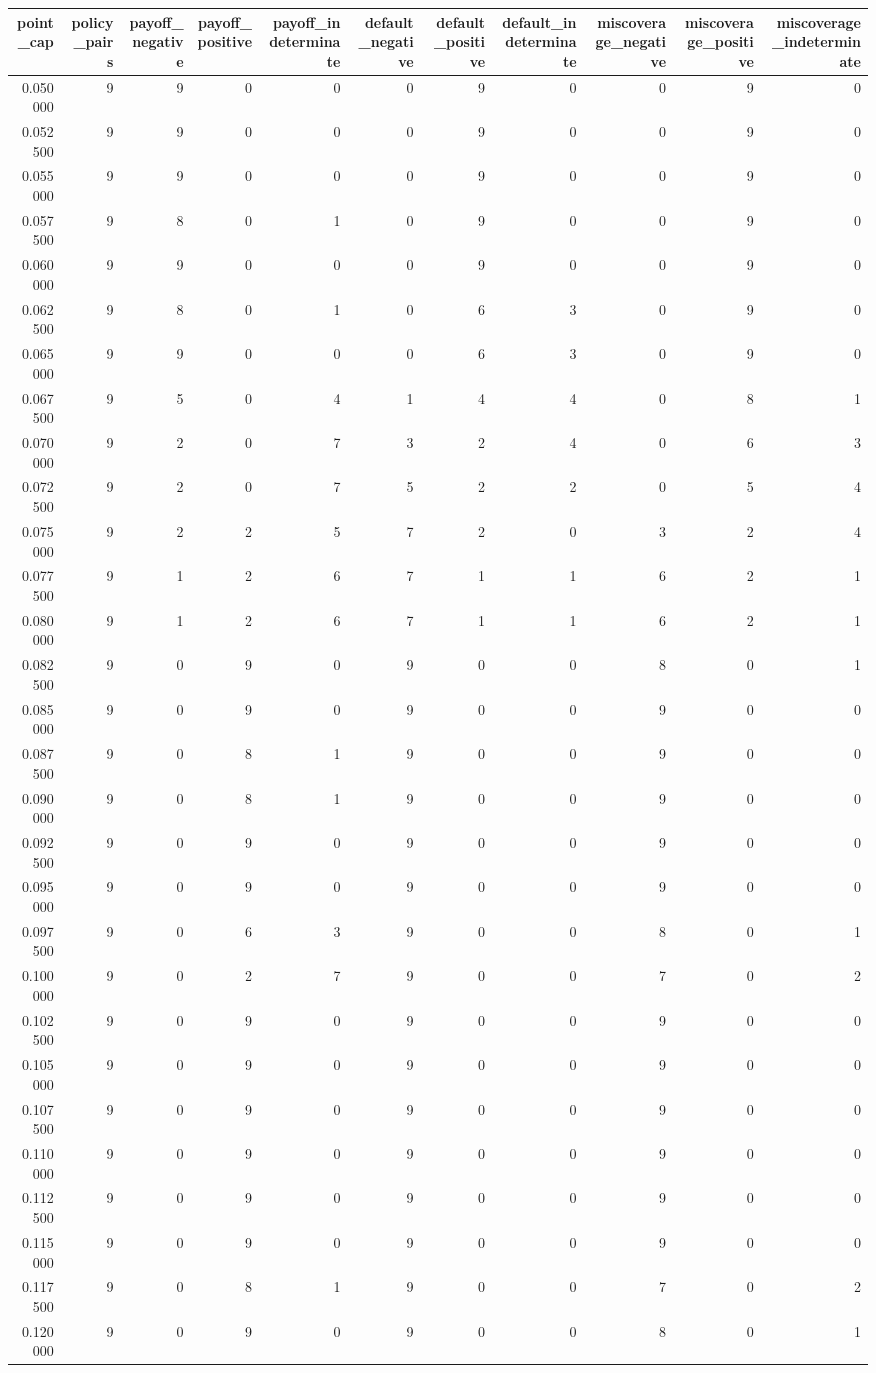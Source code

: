 \begin{tabular}{rrrrrrrrrrr}
\toprule
point\_cap & policy\_pairs & payoff\_negative & payoff\_positive & payoff\_indeterminate & default\_negative & default\_positive & default\_indeterminate & miscoverage\_negative & miscoverage\_positive & miscoverage\_indeterminate \\
\midrule
0.050000 & 9 & 9 & 0 & 0 & 0 & 9 & 0 & 0 & 9 & 0 \\
0.052500 & 9 & 9 & 0 & 0 & 0 & 9 & 0 & 0 & 9 & 0 \\
0.055000 & 9 & 9 & 0 & 0 & 0 & 9 & 0 & 0 & 9 & 0 \\
0.057500 & 9 & 8 & 0 & 1 & 0 & 9 & 0 & 0 & 9 & 0 \\
0.060000 & 9 & 9 & 0 & 0 & 0 & 9 & 0 & 0 & 9 & 0 \\
0.062500 & 9 & 8 & 0 & 1 & 0 & 6 & 3 & 0 & 9 & 0 \\
0.065000 & 9 & 9 & 0 & 0 & 0 & 6 & 3 & 0 & 9 & 0 \\
0.067500 & 9 & 5 & 0 & 4 & 1 & 4 & 4 & 0 & 8 & 1 \\
0.070000 & 9 & 2 & 0 & 7 & 3 & 2 & 4 & 0 & 6 & 3 \\
0.072500 & 9 & 2 & 0 & 7 & 5 & 2 & 2 & 0 & 5 & 4 \\
0.075000 & 9 & 2 & 2 & 5 & 7 & 2 & 0 & 3 & 2 & 4 \\
0.077500 & 9 & 1 & 2 & 6 & 7 & 1 & 1 & 6 & 2 & 1 \\
0.080000 & 9 & 1 & 2 & 6 & 7 & 1 & 1 & 6 & 2 & 1 \\
0.082500 & 9 & 0 & 9 & 0 & 9 & 0 & 0 & 8 & 0 & 1 \\
0.085000 & 9 & 0 & 9 & 0 & 9 & 0 & 0 & 9 & 0 & 0 \\
0.087500 & 9 & 0 & 8 & 1 & 9 & 0 & 0 & 9 & 0 & 0 \\
0.090000 & 9 & 0 & 8 & 1 & 9 & 0 & 0 & 9 & 0 & 0 \\
0.092500 & 9 & 0 & 9 & 0 & 9 & 0 & 0 & 9 & 0 & 0 \\
0.095000 & 9 & 0 & 9 & 0 & 9 & 0 & 0 & 9 & 0 & 0 \\
0.097500 & 9 & 0 & 6 & 3 & 9 & 0 & 0 & 8 & 0 & 1 \\
0.100000 & 9 & 0 & 2 & 7 & 9 & 0 & 0 & 7 & 0 & 2 \\
0.102500 & 9 & 0 & 9 & 0 & 9 & 0 & 0 & 9 & 0 & 0 \\
0.105000 & 9 & 0 & 9 & 0 & 9 & 0 & 0 & 9 & 0 & 0 \\
0.107500 & 9 & 0 & 9 & 0 & 9 & 0 & 0 & 9 & 0 & 0 \\
0.110000 & 9 & 0 & 9 & 0 & 9 & 0 & 0 & 9 & 0 & 0 \\
0.112500 & 9 & 0 & 9 & 0 & 9 & 0 & 0 & 9 & 0 & 0 \\
0.115000 & 9 & 0 & 9 & 0 & 9 & 0 & 0 & 9 & 0 & 0 \\
0.117500 & 9 & 0 & 8 & 1 & 9 & 0 & 0 & 7 & 0 & 2 \\
0.120000 & 9 & 0 & 9 & 0 & 9 & 0 & 0 & 8 & 0 & 1 \\
\bottomrule
\end{tabular}
